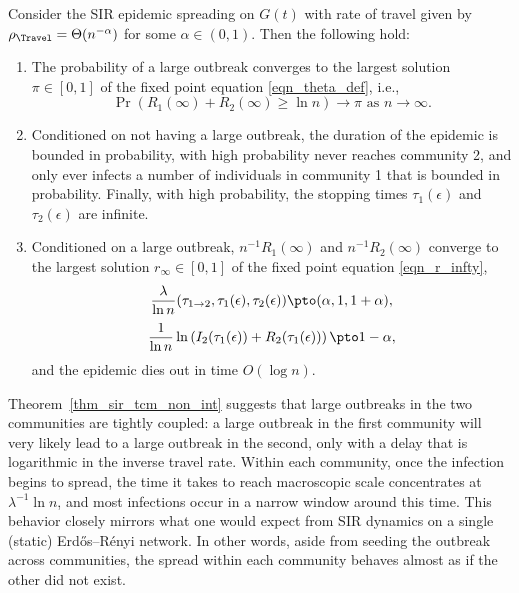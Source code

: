 \documentclass[11pt]{article}
\begin{document}
\begin{theorem}\label{thm_sir_tcm_non_int}
    Consider the SIR epidemic spreading on $G(t)$ with rate of travel given by $\rho_\Travel = \Theta(n^{-\alpha})$ for some $\alpha \in (0, 1)$.
        Then the following hold:
    \begin{enumerate}[label=(\alph*)]
        \item \label{thm:main-large-outbreak} 
        The probability of a large  outbreak converges to the largest solution $\pi\in[0,1]$ of the fixed point equation  \eqref{eqn_theta_def}, i.e.,
        \[
            \Pr(R_1(\infty) + R_2(\infty) \geq \ln n) \to \pi \text{ as } n\to\infty.
        \]
           \item \label{thm:main-survival-prob} 
           Conditioned on not having a large outbreak, the duration of the epidemic is bounded in probability, 
           with high probability never reaches community 2, and only ever infects a  number of individuals in community 1 that is bounded in probability.  Finally, with high probability, the stopping times $\tau_1(\epsilon)$ and $\tau_2(\epsilon)$ are infinite.
       \item \label{thm:main-final-size}Conditioned on a large outbreak, 
                  $n^{-1} R_1(\infty)$ and $n^{-1} R_2(\infty)$ converge to the largest solution $r_\infty\in[0,1]$ of the fixed point equation \eqref{eqn_r_infty},
                  \[\frac{\lambda}{\ln n}(\tau_{1\to 2}, \tau_1(\epsilon), \tau_2(\epsilon)) \pto (\alpha, 1, 1+\alpha),\]
   \[
   \frac 1{\ln n}\ln\left(I_2(\tau_1(\epsilon))+R_2(\tau_1(\epsilon))\right)\pto 1-\alpha,\]
   and the epidemic dies out in time $O(\log n)$.
   \end{enumerate}
\end{theorem}



 
\begin{remark}
Theorem~\ref{thm_sir_tcm_non_int} suggests that large outbreaks in the two communities are tightly coupled: a large outbreak in the first community will very likely lead to a large outbreak in the second, only with a delay that is logarithmic in the inverse travel rate. Within each community, once the infection begins to spread, the time it takes to reach macroscopic scale concentrates at $\lambda^{-1} \ln n$, and most infections occur in a narrow window around this time. This behavior closely mirrors what one would expect from SIR dynamics on a single (static) Erd\H{o}s–R\'enyi network. In other words, aside from seeding the outbreak across communities, the spread within each community behaves almost as if the other did not exist.
\end{remark}
\end{document}
